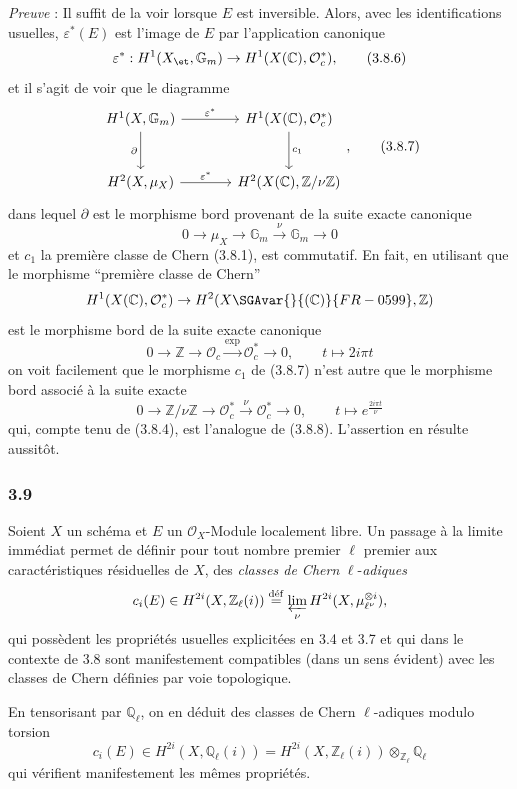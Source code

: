 \emph{Preuve} : Il suffit de la voir lorsque $E$ est inversible. Alors, avec les identifications usuelles, $\varepsilon^*(E)$ est l'image de $E$ par l'application canonique
\[
\varepsilon^*:H^1(X_{\et},\mathbb{G}_m)\to H^1(X(\mathbb{C}),\mathcal{O}_c^*),
\tag{3.8.6}
\]
et il s'agit de voir que le diagramme
\[
\begin{tikzcd}[column sep=large,row sep=large]
H^1(X,\mathbb{G}_m) \arrow[r,"\varepsilon^*"] \arrow[d,"\partial"'] &
H^1(X(\mathbb{C}),\mathcal{O}_c^*) \arrow[d,"c_1"]\\
H^2(X,\mu_X) \arrow[r,"\varepsilon^*"] &
H^2(X(\mathbb{C}),\mathbb{Z}/\nu\mathbb{Z})
\end{tikzcd},
\tag{3.8.7}
\]
dans lequel $\partial$ est le morphisme bord provenant de la suite exacte canonique
\[
0\to \mu_X\to\mathbb{G}_m\xrightarrow{\nu}\mathbb{G}_m\to0
\tag{3.8.8}
\]
et $c_1$ la première classe de Chern (3.8.1), est commutatif. En fait, en utilisant que le morphisme ``première classe de Chern''
\[
H^1(X(\mathbb{C}),\mathcal{O}_c^*)\to H^2(X\SGAvar{}{(\mathbb{C})}{FR-0599},\mathbb{Z})
\]
est le morphisme bord de la suite exacte canonique
\[
0\to\mathbb{Z}\to\mathcal{O}_c\xrightarrow{\exp}\mathcal{O}_c^*\to0,
\qquad
t\mapsto 2i\pi t
\]
on voit facilement que le morphisme $c_1$ de (3.8.7) n'est autre que le morphisme bord associé à la suite exacte
\[
0\to\mathbb{Z}/\nu\mathbb{Z}\to\mathcal{O}_c^*\xrightarrow{\nu}\mathcal{O}_c^*\to0,
\qquad
t\mapsto e^{\frac{2i\pi t}{\nu}}
\]
qui, compte tenu de (3.8.4), est l'analogue de (3.8.8). L'assertion en résulte aussitôt.

\subsubsection*{3.9}
Soient $X$ un schéma et $E$ un $\mathcal{O}_X$-Module localement libre. Un passage à la limite immédiat permet de définir pour tout nombre premier $\ell$ premier aux caractéristiques résiduelles de $X$, des \emph{classes de Chern} $\ell$-\emph{adiques}
\[
c_i(E)\in H^{2i}(X,\mathbb{Z}_\ell(i))
\stackrel{\mathrm{d\acute{e}f}}{=}\varprojlim_\nu H^{2i}(X,\mu_{\ell^\nu}^{\otimes i}),
\]
qui
possèdent les propriétés usuelles explicitées en 3.4 et 3.7 et qui dans le contexte de 3.8 sont manifestement compatibles (dans un sens évident) avec les classes de Chern définies par voie topologique.

En tensorisant par $\mathbb{Q}_\ell$, on en déduit des classes de Chern $\ell$-adiques modulo torsion
\[
c_i(E)\in H^{2i}(X,\mathbb{Q}_\ell(i))
=H^{2i}(X,\mathbb{Z}_\ell(i))\otimes_{\mathbb{Z}_\ell}\mathbb{Q}_\ell
\]
qui vérifient manifestement les mêmes propriétés.

